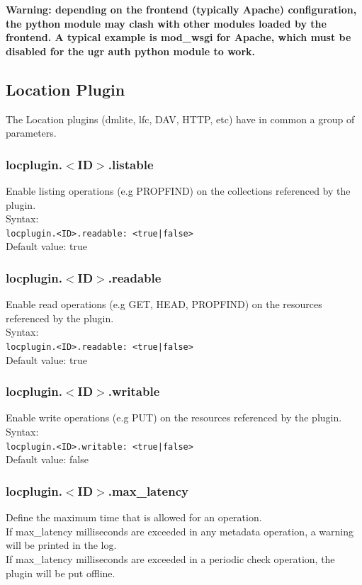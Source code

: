 \documentclass[12pt]{article} %
\begin{document}
\textbf{Warning: depending on the frontend (typically Apache) configuration, the python module may clash with other modules loaded by the frontend. A typical example is mod\_wsgi for Apache, which must be disabled for the ugr auth python module to work.
}

\subsection{Location Plugin}
The Location plugins (dmlite, lfc, DAV, HTTP, etc) have in common a group of parameters.

\subsubsection{locplugin.$<$ID$>$.listable}
Enable listing operations (e.g PROPFIND) on the collections referenced by the plugin.\\
Syntax:\\
\lstinline"locplugin.<ID>.readable: <true|false>"\\
Default value: true\\

\subsubsection{locplugin.$<$ID$>$.readable}
Enable read operations (e.g GET, HEAD, PROPFIND) on the resources referenced by the plugin.\\
Syntax:\\
\lstinline"locplugin.<ID>.readable: <true|false>"\\
Default value: true\\

\subsubsection{locplugin.$<$ID$>$.writable}
Enable write operations (e.g PUT) on the resources referenced by the plugin.\\
Syntax:\\
\lstinline"locplugin.<ID>.writable: <true|false>"\\
Default value: false\\

\subsubsection{locplugin.$<$ID$>$.max\_latency}
Define the maximum time that is allowed for an operation.\\
If max\_latency milliseconds are exceeded in any metadata operation, a warning will be printed in the log.\\
If max\_latency milliseconds are exceeded in a periodic check operation, the plugin will be put offline.\\
\end{document}
